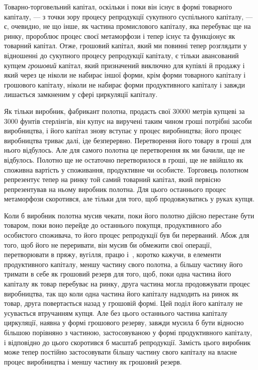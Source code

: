 Товарно-торговельний капітал, оскільки і поки він існує в формі
товарного капіталу, — з точки зору процесу репродукції сукупного суспільного капіталу, — є,
очевидно, не що інше, як
частина промислового капіталу, яка перебуває ще на ринку,
пророблює процес своєї метаморфози і тепер існує та функціонує як товарний капітал. Отже, грошовий
капітал, який ми
повинні тепер розглядати у відношенні до сукупного процесу
репродукції капіталу, є тільки авансований купцем \emph{грошовий}
капітал, який призначений виключно для купівлі й продажу
і який через це ніколи не набирає іншої форми, крім форми товарного капіталу і грошового капіталу,
ніколи не набирає форми
продуктивного капіталу і завжди лишається замкненим у сфері
циркуляції капіталу.

Як тільки виробник, фабрикант полотна, продасть свої 30000
метрів купцеві за 3000 фунтів стерлінгів, він купує на виручені таким чином гроші потрібні засоби
виробництва, і його капітал
знову вступає у процес виробництва; його процес виробництва
триває далі, іде безперервно. Перетворення його товару в гроші
для нього відбулось. Але для самого полотна це перетворення
як ми бачили, ще не відбулось. Полотно ще не остаточно перетворилося
в гроші, ще не ввійшло як споживна вартість у споживання,
продуктивне чи особисте. Торговець полотном репрезентує
тепер на ринку той самий товарний капітал, який первісно
репрезентував на ньому виробник полотна. Для цього
останнього процес метаморфози скоротився, але тільки для того,
щоб продовжуватись у руках купця.

Коли б виробник полотна мусив чекати, поки його полотно
дійсно перестане бути товаром, поки воно перейде до останнього
покупця, продуктивного або особистого споживача, то
його процес репродукції був би перерваний. Абож для того, щоб
його не переривати, він мусив би обмежити свої операції, перетворювати
в пряжу, вугілля, працю і~, коротко кажучи,
в елементи продуктивного капіталу, меншу частину свого полотна,
а більшу частину його тримати в себе як грошовий резерв
для того, щоб, поки одна частина його капіталу як товар
перебуває на ринку, друга частина могла продовжувати процес
виробництва, так що коли одна частина його капіталу надходить
на ринок як товар, друга повертається назад у грошовій
формі. Цей поділ його капіталу не усувається втручанням купця.
Але без цього останнього частина капіталу циркуляції, наявна
у формі грошового резерву, завжди мусила б бути відносно
більшою порівняно з частиною, застосовуваною у формі продуктивного
капіталу, і відповідно до цього скоротився б масштаб
репродукції. Замість цього виробник може тепер постійно
застосовувати більшу частину свого капіталу на власне процес
виробництва і меншу частину як грошовий резерв.

